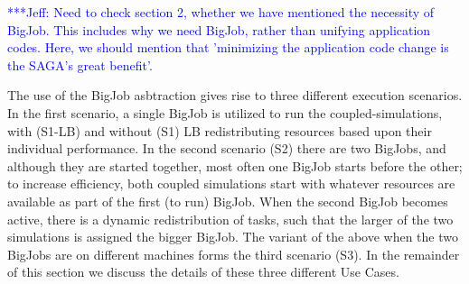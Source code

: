 \documentclass[conference,final]{IEEEtran}
\newcommand{\jhanote}[1]{ {\textcolor{red} { ***Jha: #1 }}}
\newcommand{\skonote}[1]{ {\textcolor{blue} { ***Jeff: #1 }}}
\newcommand{\jhanote}[1]{}
\newcommand{\skonote}[1]{}
\begin{document}
\skonote{Need to check section 2, whether we have mentioned the
  necessity of BigJob. This includes why we need BigJob, rather than
  unifying application codes. Here, we should mention that 'minimizing
  the application code change is the SAGA's great benefit'.}


The use of the BigJob asbtraction gives rise to three different
execution scenarios. In the first scenario, a single BigJob is
utilized to run the coupled-simulations, with (S1-LB) and without (S1)
LB redistributing resources based upon their individual performance.
In the second scenario (S2) there are two BigJobs, and although they
are started together, most often one BigJob starts before the other;
to increase efficiency, both coupled simulations start with whatever
resources are available as part of the first (to run) BigJob. When the
second BigJob becomes active, there is a dynamic redistribution of
tasks, such that the larger of the two simulations is assigned the
bigger BigJob. The variant of the above when the two BigJobs are on
different machines forms the third scenario (S3). In the remainder of
this section we discuss the details of these three different Use
Cases.


\end{document}

